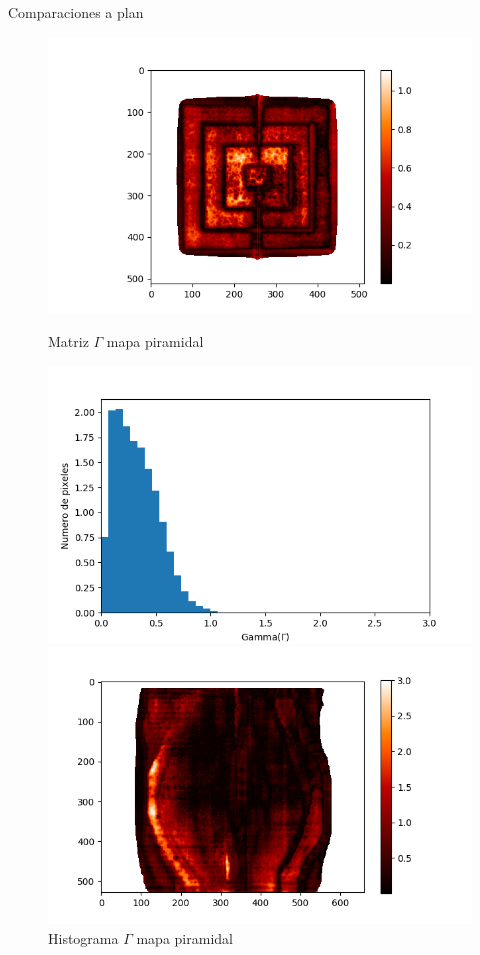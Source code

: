 \documentclass[12pt]{beamer}
\begin{document}
\begin{frame}{Comparaciones a plan}
\begin{figure}[htp]%
	\centering
	\begin{minipage}{0.45\textwidth}
		\includegraphics[width=\textwidth]{images/gammaPiramideCalor.png}
		\caption{Matriz $\Gamma$ mapa piramidal}
	\end{minipage}\hfill
	\begin{minipage}{0.45\textwidth}
		\includegraphics[width=\textwidth]{images/histogramaGammaPiramide.png}
		\caption{Histograma $\Gamma$ mapa piramidal}
	\end{minipage}\par
	\begin{minipage}{0.45\textwidth}
		\includegraphics[width=\textwidth]{images/gammaMama.png}

\end{minipage}
\end{figure}
\end{frame}
\end{document}
